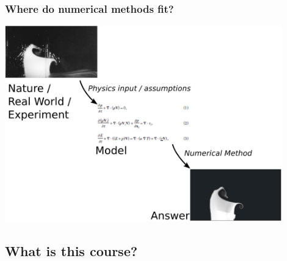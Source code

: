 \documentclass{beamer}
\begin{document}
\begin{frame}
  \frametitle{Where do numerical methods fit?}

  \begin{center}
    \includegraphics[width=0.9\textwidth]{figures/ModelMethodReality}
  \end{center}

\end{frame}


\subsection{What is this course?}
\end{document}
